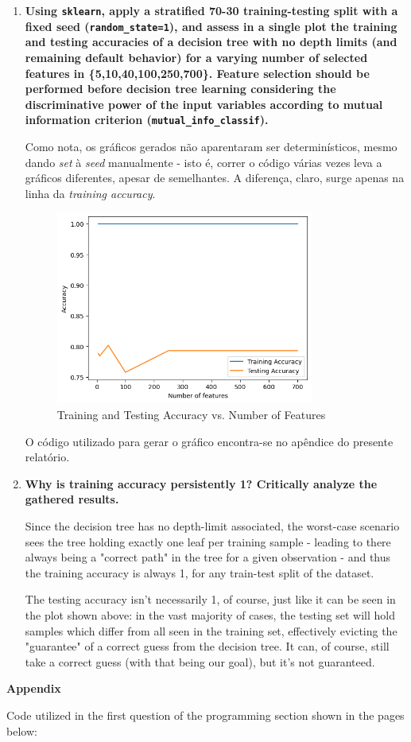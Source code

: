 \documentclass[12pt]{article}
\begin{document}
\begin{enumerate}[leftmargin=\labelsep,resume]
\item \textbf{Using \texttt{sklearn}, apply a stratified 70-30 training-testing split with a fixed seed (\texttt{random\_state=1}), and assess in a single plot the training and testing accuracies of a decision tree with no depth limits (and remaining default behavior) for a varying number of selected features in \{5,10,40,100,250,700\}. Feature selection should be performed before decision tree learning considering the discriminative power of the input variables according to mutual information criterion (\texttt{mutual\_info\_classif}).}

Como nota, os gráficos gerados não aparentaram ser determinísticos, mesmo dando \textit{set} à \textit{seed} manualmente - isto é,
correr o código várias vezes leva a gráficos diferentes, apesar de semelhantes.
A diferença, claro, surge apenas na linha da \textit{training accuracy}.

\begin{figure}[htpb]
  \centering
  \includegraphics[width=0.8\textwidth]{../assets/hw1-2.1.png}
  \caption{Training and Testing Accuracy vs. Number of Features}
\end{figure}

O código utilizado para gerar o gráfico encontra-se no apêndice do presente relatório.

\item \textbf{Why is training accuracy persistently 1? Critically analyze the gathered results.}

Since the decision tree has no depth-limit associated, the worst-case scenario sees the tree
holding exactly one leaf per training sample - leading to there always being a "correct path" in the tree for a given observation - and thus the training accuracy is always 1, for any train-test split of the dataset.

The testing accuracy isn't necessarily 1, of course, just like it can be seen in the plot shown above: in the vast majority of cases, the testing set will hold samples which differ from all seen in the training set, effectively evicting the "guarantee" of a correct guess from the decision tree. It can, of course, still take a correct guess (with that being our goal), but it's not guaranteed.

\end{enumerate}

\large{\textbf{Appendix}\vskip 0.3cm}

Code utilized in the first question of the programming section shown in the pages below:


\end{document}
